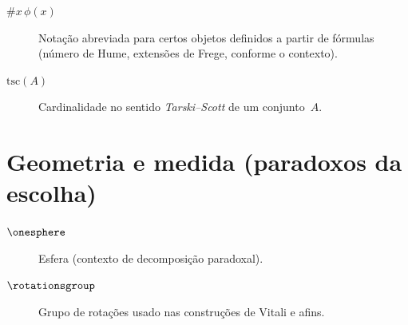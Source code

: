 \begin{description}
\item[$\# x\,\phi(x)$] Notação abreviada para certos objetos definidos a partir de fórmulas (número de Hume, extensões de Frege, conforme o contexto).
\item[$\mathrm{tsc}(A)$] Cardinalidade no sentido \emph{Tarski--Scott} de um conjunto~$A$.
\end{description}

\section*{Geometria e medida (paradoxos da escolha)}

\begin{description}
\item[$\onesphere$] Esfera (contexto de decomposição paradoxal).
\item[$\rotationsgroup$] Grupo de rotações usado nas construções de Vitali e afins.
\end{description}
